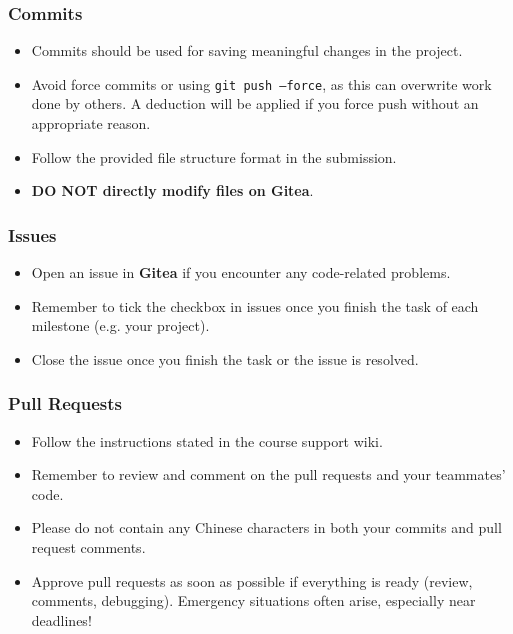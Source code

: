 \documentclass[
	11pt, %
]{beamer}
\begin{document}
\begin{frame}
	\frametitle{Commits}
 
	\begin{itemize}
    \item Commits should be used for saving meaningful changes in the project.
    \item Avoid force commits or using \texttt{git push --force}, as this can overwrite work done by others. A deduction will be applied if you force push without an appropriate reason.
    \item Follow the provided file structure format in the submission.
    \item \textbf{DO NOT directly modify files on Gitea}.
\end{itemize}

\end{frame}


\begin{frame}
	\frametitle{Issues}
 
	\begin{itemize}
    \item Open an issue in \textbf{Gitea} if you encounter any code-related problems.
    \item Remember to tick the checkbox in issues once you finish the task of each milestone (e.g. your project).
    \item Close the issue once you finish the task or the issue is resolved.
\end{itemize}

\end{frame}



\begin{frame}
	\frametitle{Pull Requests}
 
	\begin{itemize}
    \item Follow the instructions stated in the course support wiki.
    \item Remember to review and comment on the pull requests and your teammates' code.
    \item Please do not contain any Chinese characters in both your commits and pull request comments.
    \item Approve pull requests as soon as possible if everything is ready (review, comments, debugging). Emergency situations often arise, especially near deadlines!
\end{itemize}

\end{frame}
\end{document}
